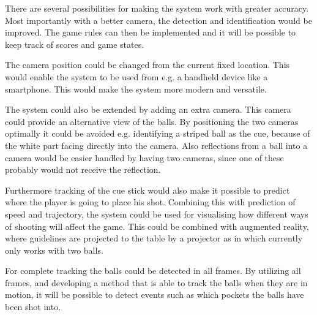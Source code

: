 There are several possibilities for making the system work with greater accuracy. Most importantly with a better camera, the detection and identification would be improved. The game rules can then be implemented and it will be possible to keep track of scores and game states.

The camera position could be changed from the current fixed location. This would enable the system to be used from e.g. a handheld device like a smartphone. This would make the system more modern and versatile.

The system could also be extended by adding an extra camera. This camera could provide an alternative view of the balls. By positioning the two cameras optimally it could be avoided e.g. identifying a striped ball as the cue, because of the white part facing directly into the camera. Also reflections from a ball into a camera would be easier handled by having two cameras, since one of these probably would not receive the reflection.

Furthermore tracking of the cue stick would also make it possible to predict where the player is going to place his shot. Combining this with prediction of speed and trajectory, the system could be used for visualising how different ways of shooting will affect the game. This could be combined with augmented reality, where guidelines are projected to the table by a projector as in \cite{larsbopool} which currently only works with two balls.

For complete tracking the balls could be detected in all frames. By utilizing all frames, and developing a method that is able to track the balls when they are in motion, it will be possible to detect events such as which pockets the balls have been shot into.